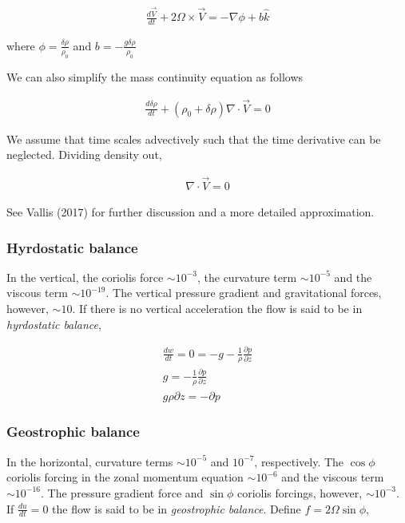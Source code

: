 \documentclass[a4paper,12pt]{article}
\begin{document}
\begin{align}
\frac{d\vec{V}}{dt} + 2\Omega \times \vec{V} = -\nabla \phi + b\hat{k}
\end{align}

where $\phi = \frac{\delta \rho}{\rho_0}$ and $b = -\frac{g\delta\rho}{\rho_0}$

We can also simplify the mass continuity equation as follows

\begin{align}
\boxed{\frac{d\delta\rho}{dt} + (\rho_0 +\delta\rho)\nabla \cdot \vec{V} = 0}
\end{align}

We assume that time scales advectively such that the time derivative can be neglected. Dividing density out, 

\begin{align}
\boxed{\nabla \cdot \vec{V} = 0}
\end{align}

See Vallis (2017) for further discussion and a more detailed approximation.


\subsubsection*{Hyrdostatic balance}
In the vertical, the coriolis force $\sim 10^{-3}$, the curvature term $\sim 10^{-5}$ and the viscous term $\sim 10^{-19}$. The vertical pressure gradient and gravitational forces, however, $\sim 10$. If there is no vertical acceleration the flow is said to be in \emph{hyrdostatic balance},

\begin{align}
\frac{dw}{dt} = 0 = -g - \frac{1}{\rho}\frac{\partial p}{\partial z}\\
g = -\frac{1}{\rho}\frac{\partial p}{\partial z}\\
\boxed{g\rho\partial z = -\partial p}
\end{align}

\subsubsection*{Geostrophic balance}
In the horizontal, curvature terms $\sim 10^{-5}$ and $10^{-7}$, respectively. The $\cos\phi$ coriolis forcing in the zonal momentum equation $\sim 10^{-6}$ and the viscous term $\sim 10^{-16}$. The pressure gradient force and $\sin\phi$ coriolis forcings, however, $\sim 10^{-3}$. If $\frac{du}{dt} = 0$ the flow is said to be in \emph{geostrophic balance}.
Define $ f = 2\Omega\sin\phi$,
\end{document}
